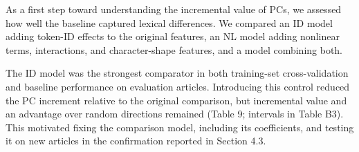 As a first step toward understanding the incremental value of PCs, we assessed how well the baseline captured lexical differences. We compared an ID model adding token-ID effects to the original features, an NL model adding nonlinear terms, interactions, and character-shape features, and a model combining both.

The ID model was the strongest comparator in both training-set cross-validation and baseline performance on evaluation articles. Introducing this control reduced the PC increment relative to the original comparison, but incremental value and an advantage over random directions remained (Table 9; intervals in Table B3). This motivated fixing the comparison model, including its coefficients, and testing it on new articles in the confirmation reported in Section 4.3.

\begingroup
\fontsize{9.3}{12}\selectfont\setlength{\tabcolsep}{3.3pt}
